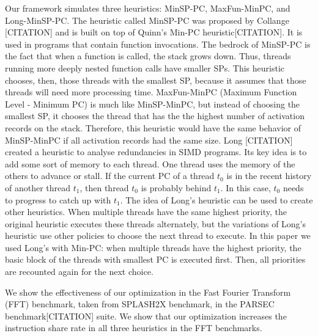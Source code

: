 \documentclass[times,10pt,twocolumn]{article}
\begin{document}
Our framework simulates three heuristics: MinSP-PC, MaxFun-MinPC, and Long-MinSP-PC.
The heuristic called MinSP-PC was proposed by Collange [CITATION] and is 
built on top of Quinn's Min-PC heuristic[CITATION].
It is used in programs that contain function invocations.
The bedrock of MinSP-PC is the fact that when a function is called, the stack
grows down.
Thus, threads running more deeply nested function calls have smaller SPs.
This heuristic chooses, then, those threads with the smallest SP, because it
assumes that those threads will need more processing time.
MaxFun-MinPC (Maximum Function Level - Minimum PC) is much like MinSP-MinPC,
but instead of choosing the smallest SP, it chooses the thread that has the the
highest number of activation records on the stack.
Therefore, this heuristic would have the same behavior of MinSP-MinPC if all
activation records had the same size. 
Long [CITATION] created a heuristic to analyse redundancies in SIMD programs.
Its key idea is to add some sort of memory to each thread.
One thread uses the memory of the others to advance or stall.
If the current PC of a thread $t_{0}$ is in the recent history of another
thread $t_{1}$, then thread $t_{0}$ is probably behind $t_{1}$.
In this case, $t_{0}$ needs to progress to catch up with $t_{1}$.
The idea of Long’s heuristic can be used to create other heuristics.
When multiple threads have the same highest priority, the original heuristic
executes these threads alternately, but the variations of Long's heuristic use
other policies to choose the next thread to execute.
In this paper we used Long's with Min-PC: when multiple threads have the
highest priority, the basic block of the threads with smallest PC is executed
first.
Then, all priorities are recounted again for the next choice.

We show the effectiveness of our optimization in the Fast 
Fourier Transform (FFT) benchmark, taken from SPLASH2X benchmark, in the
PARSEC benchmark[CITATION] suite.
We show that our optimization increases the
instruction share rate in all three heuristics in the FFT benchmarks.

\end{document}
